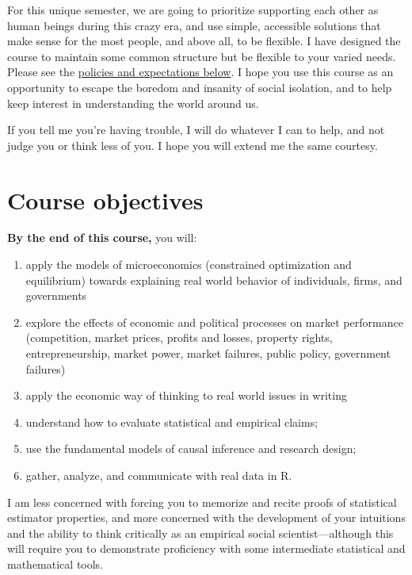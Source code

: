 \documentclass{article}
\begin{document}
For this unique semester, we are going to prioritize supporting each
other as human beings during this crazy era, and use simple, accessible
solutions that make sense for the most people, and above all, to be
flexible. I have designed the course to maintain some common structure
but be flexible to your varied needs. Please see the
\protect\hyperlink{policies-and-expectations}{policies and expectations
below}. I hope you use this course as an opportunity to escape the
boredom and insanity of social isolation, and to help keep interest in
understanding the world around us.

If you tell me you're having trouble, I will do whatever I can to help,
and not judge you or think less of you. I hope you will extend me the
same courtesy.

\hypertarget{course-objectives}{%
\section*{Course objectives}\label{course-objectives}}

\textbf{By the end of this course,} you will:

\begin{enumerate}
\def\labelenumi{\arabic{enumi}.}
\item
  apply the models of microeconomics (constrained optimization and
  equilibrium) towards explaining real world behavior of individuals,
  firms, and governments
\item
  explore the effects of economic and political processes on market
  performance (competition, market prices, profits and losses, property
  rights, entrepreneurship, market power, market failures, public
  policy, government failures)
\item
  apply the economic way of thinking to real world issues in writing
\item
  understand how to evaluate statistical and empirical claims;
\item
  use the fundamental models of causal inference and research design;
\item
  gather, analyze, and communicate with real data in R.
\end{enumerate}

I am less concerned with forcing you to memorize and recite proofs of
statistical estimator properties, and more concerned with the
development of your intuitions and the ability to think critically as an
empirical social scientist---although this will require you to
demonstrate proficiency with some intermediate statistical and
mathematical tools.
\end{document}
